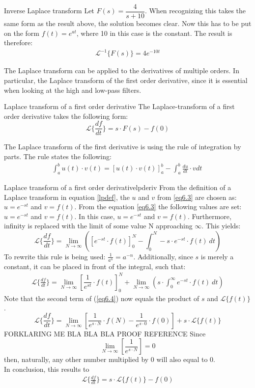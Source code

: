 \begin{example}{Inverse Laplace transform}{}
Let $F(s) = \dfrac{4}{s+10}$. When recognizing this takes the same form as the result above, the solution becomes clear. Now this has to be put on the form $f(t)=e^{at}$, where 10 in this case is the constant. The result is therefore: \cite[p. 323]{diffandcomplex}
\begin{align}
\mathcal{L}^{-1}\{F(s)\} = 4e^{-10t}
\end{align}
\end{example}
The Laplace transform can be applied to the derivatives of multiple orders. In particular, the Laplace transform of the first order derivative, since it is essential when looking at the high and low-pass filters.
\begin{theorem}{Laplace transform of a first order derivative}{}
The Laplace-transform of a first order derivative takes the following form:
$$\mathcal{L}\{\frac{df}{dt}\} = s \cdot F(s)-f(0)$$
\end{theorem}
The Laplace transform of the first derivative is using the rule of integration by parts. The rule states the following:
\begin{align}
\int_{a}^{b}{u(t) \cdot v(t)}=\left[u(t) \cdot v(t) \right]_{a}^{b}-\int_{a}^{b} \frac{du}{dt}\cdot v dt\
\label{eq6.3}
\end{align}
\begin{prof}{Laplace transform of a first order derivative}{lpderiv}
From the definition of a Laplace transform in equation \ref{lpdef}, the $u$ and $v$ from \ref{eq6.3} are chosen as: $u=e^{-st}$ and $v=f(t)$.
From the equation \ref{eq6.3} the following values are set: $u=e^{-st}$ and $v=f(t)$.
In this case, $u=e^{-st}$ and $v=f(t)$. Furthermore, infinity is replaced with the limit of some value N approaching $\infty$. This yields:
$$\mathcal{L}\{\frac{df}{dt}\}=\lim_{N \to \infty} \left(\left[e^{-st}\cdot f(t)\right]_{0}^{N}-\int_{0}^{N} -s\cdot e^{-st}\cdot f(t)\ dt \right)$$
To rewrite this rule is being used: $\frac{1}{a^n}=a^{-n}$. Additionally, since $s$ is merely a constant, it can be placed in front of the integral, such that:
\begin{align}
\mathcal{L}\{\frac{df}{dt}\}=\lim_{N \to \infty} \left[\dfrac{1}{e^{st}}\cdot f(t)\right]_{0}^{N}+ \lim_{N \to \infty} \left(s\cdot \int_{0}^{\infty}e^{-st}\cdot f(t)\ dt \right)
\end{align} \label{eq6.4}
Note that the second term of (\ref{eq6.4}) now equals the product of $s$ and $\mathcal{L}\{f(t)\}$.
$$\mathcal{L}\{\frac{df}{dt}\} = \lim_{N \to \infty}\left[\dfrac{1}{e^{s\cdot N}}\cdot f(N)-\dfrac{1}{e^{s\cdot 0}}\cdot f(0)\right]+s\cdot \mathcal{L}\{f(t)\}$$
FORKLARING ME BLA BLA BLA PROOF REFERENCE
Since $$\lim_{N \to \infty}\left[\dfrac{1}{e^{s\cdot N}}\right]=0$$ then, naturally, any other number multiplied by 0 will also equal to 0.\\
In conclusion, this results to
\begin{align*}
\mathcal{L}\{\frac{df}{dt}\} = s\cdot \mathcal{L}\{f(t)\}-f(0)
\end{align*}
\end{prof}

